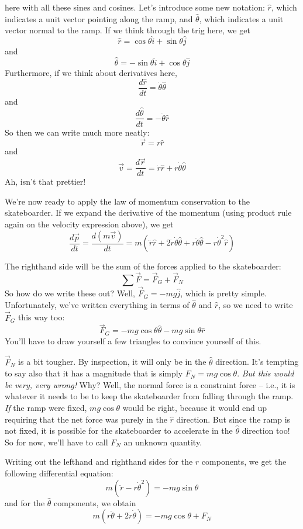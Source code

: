  here with all these sines and cosines.  Let's introduce some new notation: $\hat{r}$, which indicates a unit vector pointing along the ramp, and $\hat{\theta}$, which indicates a unit vector normal to the ramp.  If we think through the trig here, we get
$$\hat{r} = \cos \theta \hat{i} + \sin \theta \hat{j}$$
and
$$\hat{\theta} = -\sin \theta \hat{i} + \cos \theta \hat{j}$$
Furthermore, if we think about derivatives here,
$$\frac{d\hat{r}}{dt} = \dot{\theta} \hat{\theta}$$
and 
$$\frac{d\hat{\theta}}{dt} = -\dot{\theta} \hat{r}$$
So then we can write much more neatly:
$$\vec{r} = r \hat{r}$$
and 
$$\vec{v} = \frac{d\vec{r}}{dt} = \dot{r} \hat{r} + r \dot{\theta} \hat{\theta}$$
Ah, isn't that prettier!

We're now ready to apply the law of momentum conservation to the skateboarder.  If we expand the derivative of the momentum (using product rule again on the velocity expression above), we get
$$\frac{d\vec{p}}{dt}  = \frac{d(m\vec{v})}{dt} = m(\ddot{r} \hat{r} + 2\dot{r}\dot{\theta}\hat{\theta} + r\ddot{\theta}\hat{\theta} - r\dot{\theta}^2\hat{r})$$

The righthand side will be the sum of the forces applied to the skateboarder:
$$\sum \vec{F}  = \vec{F}_G + \vec{F}_N$$
So how do we write these out?
Well, $\vec{F}_G = -mg\hat{j}$, which is pretty simple.  Unfortunately, we've written everything in terms of $\hat{\theta}$ and $\hat{r}$, so we need to write $\vec{F}_G$ this way too:
$$\vec{F}_G = -mg\cos \theta \hat{\theta} - mg \sin \theta \hat{r}$$
You'll have to draw yourself a few triangles to convince yourself of this.

$ \vec{F}_N$ is a bit tougher.  By inspection, it will only be in the $\hat{\theta}$ direction.  It's tempting to say also that it has a magnitude that is simply $F_N = mg\cos \theta$.  {\em But this would be very, very wrong!}  Why?  Well, the normal force is a constraint force -- i.e., it is whatever it needs to be to keep the skateboarder from falling through the ramp.  {\em If} the ramp were fixed, $mg\cos \theta$ would be right, because it would end up requiring that the net force was purely in the $\hat{r}$ direction.  But since the ramp is not fixed, it is possible for the skateboarder to accelerate in the $\hat{\theta}$ direction too!  So for now, we'll have to call $F_N$ an unknown quantity.  

Writing out the lefthand and righthand sides for the $\hat{r}$ components, we get the following differential equation:
$$m(\ddot{r} - r \dot{\theta}^2)  = -mg\sin \theta$$
and for the $\hat{\theta}$ components, we obtain
$$m(r\ddot{\theta}  + 2\dot{r}\dot{\theta}) = -mg \cos \theta + F_N$$

